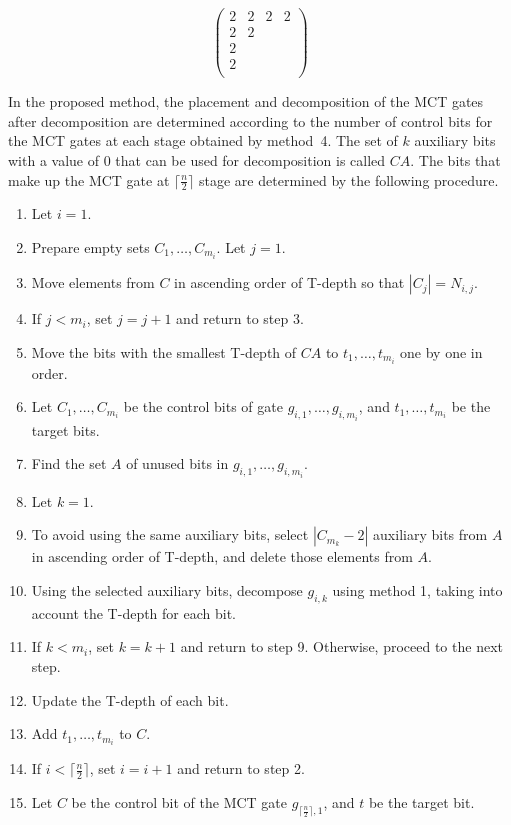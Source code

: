 \begin{equation}\label{eq:niemann_c_2}
\begin{pmatrix}
2 & 2 & 2 & 2 \\
2 & 2 & & \\
2 & & & \\
2 & & & \\
\end{pmatrix}
\end{equation}
\par
In the proposed method, the placement and decomposition of the MCT gates after decomposition are determined according to the number of control bits for the MCT gates at each stage obtained by method~4.
The set of $k$ auxiliary bits with a value of 0 that can be used for decomposition is called $CA$.
The bits that make up the MCT gate at $\lceil \frac{n}{2} \rceil$ stage are determined by the following procedure.
\begin{enumerate}[Step 1]
\item Let $i=1$.
\item Prepare empty sets $C_{1},\dots ,C_{m_{i}}$. Let $j=1$.
\item Move elements from $C$ in ascending order of T-depth so that $|C_{j}|=N_{i, j}$.
\item If $j<m_{i}$, set $j=j+1$ and return to step 3.
\item Move the bits with the smallest T-depth of $CA$ to $t_{1},\dots, t_{m_{i}}$ one by one in order.
\item Let $C_{1},\dots, C_{m_{i}}$ be the control bits of gate $g_{i, 1},\dots, g_{i, m_{i}}$, and $t_{1},\dots ,t_{m_{i}}$ be the target bits.
\item Find the set $A$ of unused bits in $g_{i, 1},\dots ,g_{i, m_{i}}$.
\item Let $k=1$.
\item To avoid using the same auxiliary bits,
select $|C_{m_{k}}-2|$ auxiliary bits from $A$ in ascending order of T-depth, and delete those elements from $A$.
\item Using the selected auxiliary bits,
decompose $g_{i, k}$ using method 1,
taking into account the T-depth for each bit.
\item If $k < m_{i}$, set $k=k+1$ and return to step 9. Otherwise, proceed to the next step.
\item Update the T-depth of each bit.
\item Add $t_{1},\dots, t_{m_{i}}$ to $C$.
\item If $i< \lceil \frac{n}{2} \rceil$, set $i=i+1$ and return to step 2.
\item Let $C$ be the control bit of the MCT gate $g_{\lceil \frac{n}{2} \rceil, 1}$, and $t$ be the target bit.
\end{enumerate}
